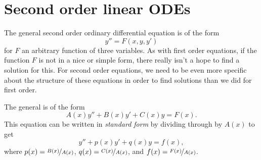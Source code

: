 
\section{Second order linear ODEs} \label{solinear:section}




The general second order ordinary differential equation is of the form 
\begin{equation*}
y'' = F(x, y, y')
\end{equation*} for $F$ an arbitrary function of three variables. As with first order equations, if the function $F$ is not in a nice or simple form, there really isn't a hope to find a solution for this. For second order equations, we need to be even more specific about the structure of these equations in order to find solutions than we did for first order.


\begin{definition}
The general
\emph{} is of the form
\begin{equation*}
A(x) y'' + B(x)y' + C(x)y = F(x) .
\end{equation*}
This equation can be written in \emph{standard form} by dividing through by $A(x)$ to get
\begin{equation} \label{sol:eqlin}
y'' + p(x)y' + q(x)y = f(x) ,
\end{equation}
where $p(x) = \nicefrac{B(x)}{A(x)}$, $q(x) = \nicefrac{C(x)}{A(x)}$, and
$f(x) = \nicefrac{F(x)}{A(x)}$.
\end{definition}

